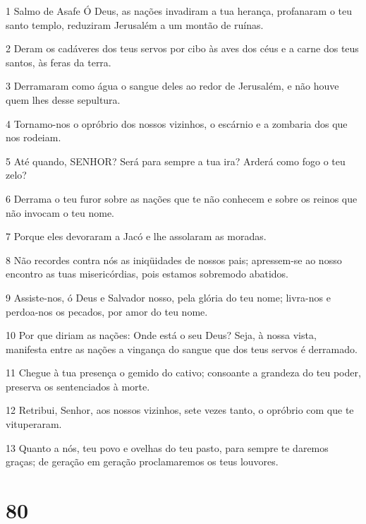 \par 1 Salmo de Asafe Ó Deus, as nações invadiram a tua herança, profanaram o teu santo templo, reduziram Jerusalém a um montão de ruínas.
\par 2 Deram os cadáveres dos teus servos por cibo às aves dos céus e a carne dos teus santos, às feras da terra.
\par 3 Derramaram como água o sangue deles ao redor de Jerusalém, e não houve quem lhes desse sepultura.
\par 4 Tornamo-nos o opróbrio dos nossos vizinhos, o escárnio e a zombaria dos que nos rodeiam.
\par 5 Até quando, SENHOR? Será para sempre a tua ira? Arderá como fogo o teu zelo?
\par 6 Derrama o teu furor sobre as nações que te não conhecem e sobre os reinos que não invocam o teu nome.
\par 7 Porque eles devoraram a Jacó e lhe assolaram as moradas.
\par 8 Não recordes contra nós as iniqüidades de nossos pais; apressem-se ao nosso encontro as tuas misericórdias, pois estamos sobremodo abatidos.
\par 9 Assiste-nos, ó Deus e Salvador nosso, pela glória do teu nome; livra-nos e perdoa-nos os pecados, por amor do teu nome.
\par 10 Por que diriam as nações: Onde está o seu Deus? Seja, à nossa vista, manifesta entre as nações a vingança do sangue que dos teus servos é derramado.
\par 11 Chegue à tua presença o gemido do cativo; consoante a grandeza do teu poder, preserva os sentenciados à morte.
\par 12 Retribui, Senhor, aos nossos vizinhos, sete vezes tanto, o opróbrio com que te vituperaram.
\par 13 Quanto a nós, teu povo e ovelhas do teu pasto, para sempre te daremos graças; de geração em geração proclamaremos os teus louvores.

\chapter{80}

